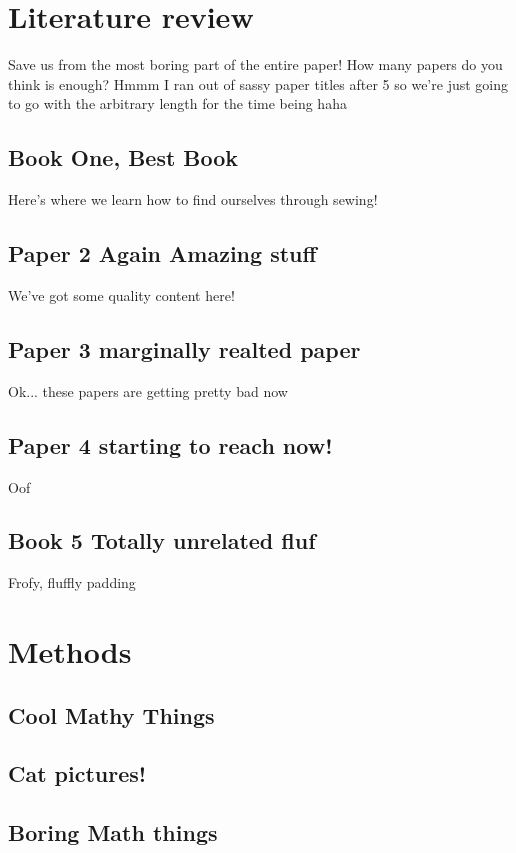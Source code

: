 \documentclass[]{article}
\begin{document}
\section{Literature review}
Save us from the most boring part of the entire paper! How many papers do you think is enough? Hmmm I ran out of sassy paper titles after 5 so we're just going to go with the arbitrary length for the time being haha
\subsection{Book One, Best Book}
Here's where we learn how to find ourselves through sewing! \cite{nancyBook}
\subsection{Paper 2 Again Amazing stuff}
We've got some quality content here! \cite{nancyArticle}
\subsection{Paper 3 marginally realted paper }
Ok... these papers are getting pretty bad now \cite{adamArticle}
\subsection{Paper 4 starting to reach now!}
Oof \cite{adamArticle2}
\subsection{Book 5 Totally unrelated fluf}
Frofy, fluffly padding \cite{adamBook}

\newpage
\section{Methods}
\subsection{Cool Mathy Things}
\subsection{Cat pictures!}
\subsection{Boring Math things}

\newpage


\end{document}
